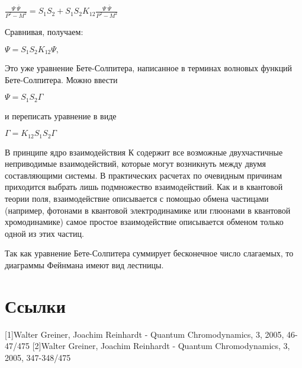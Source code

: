 \documentclass[a4paper,14pt,russian]{article}
\begin{document}
$ \frac{\Psi\;\bar\Psi}{P^2-M^2} = S_1 S_2 +S_1 S_2  K_{12}\frac{\Psi\;\bar\Psi}{P^2-M^2} $

Сравнивая, получаем:

$ \Psi=S_1 S_2  K_{12}\Psi,   $

Это уже уравнение Бете-Солпитера, написанное в терминах волновых функций Бете-Солпитера. Можно ввести

$  \Psi = S_1 S_2 \Gamma $

и переписать уравнение в виде

$ \Gamma= K_{12} S_1 S_2 \Gamma $

В принципе ядро взаимодействия $К$ содержит все возможные двухчастичные неприводимые взаимодействий, которые могут возникнуть между двумя составляющими системы. В практических расчетах по очевидным причинам приходится выбрать лишь подмножество взаимодействий. Как и в квантовой теории поля, взаимодействие описывается с помощью обмена частицами (например, фотонами в квантовой электродинамике или глюонами в квантовой хромодинамике) самое простое взаимодействие описывается обменом только одной из этих частиц.

Так как уравнение Бете-Солпитера суммирует бесконечное число слагаемых, то диаграммы Фейнмана имеют вид лестницы.

\section{Ссылки}

[1]Walter Greiner, Joachim Reinhardt - Quantum Chromodynamics, 3, 2005, 46-47/475
[2]Walter Greiner, Joachim Reinhardt - Quantum Chromodynamics, 3, 2005, 347-348/475
\end{document}
